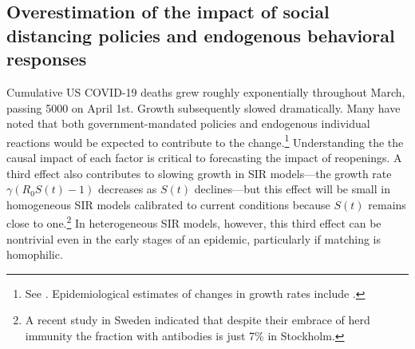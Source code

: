 \documentclass[11pt]{article}
\begin{document}
\subsection{Overestimation of the impact of social distancing policies and endogenous behavioral responses}

Cumulative US COVID-19 deaths grew roughly exponentially throughout March, passing 5000 on April 1st. Growth subsequently 
slowed dramatically. Many have noted that both government-mandated policies and endogenous individual reactions 
would be expected to contribute to the change.\footnote{See \citet{baqaee2020reopening,farboodi2020internal,fernandez2020estimating,jones2020optimal, kudlyak2020for}. Epidemiological estimates of changes in growth rates include
\citet{miller2020full, unwin2020state}.} Understanding the the causal impact of each factor is critical to 
forecasting the impact of reopenings. A third effect also contributes to slowing growth in SIR models---the growth rate
$\gamma (R _0 S(t) - 1)$ decreases as $S(t)$ declines---but this effect will be small in homogeneous SIR models calibrated to current conditions because $S(t)$ remains close to one.\footnote{A recent study in Sweden indicated that despite their embrace of herd immunity the fraction with antibodies is just
7\% in Stockholm.} In heterogeneous SIR models, however, this third effect can be nontrivial
even in the early stages of an epidemic, particularly if
matching is homophilic.
\end{document}
